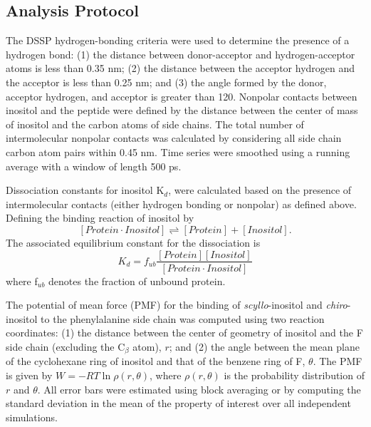 \subsection{Analysis Protocol} %
\label{sub:analysis}

	The DSSP hydrogen-bonding criteria were used to determine the presence of a hydrogen bond: (1) the distance between donor-acceptor and hydrogen-acceptor atoms is less than 0.35 nm; (2) the distance between the acceptor hydrogen and the acceptor is less than 0.25 nm; and (3) the angle formed by the donor, acceptor hydrogen, and acceptor is greater than 120\mathdeg.\cite{Kabsch:1983p31} Nonpolar contacts between inositol and the peptide were defined by the distance between the center of mass of inositol and the carbon atoms of side chains. The total number of intermolecular nonpolar contacts was calculated by considering all side chain carbon atom pairs within 0.45 nm. Time series were smoothed using a running average with a window of length 500 ps.

	Dissociation constants for inositol K$_d$, were calculated based on the presence of intermolecular contacts (either hydrogen bonding or nonpolar) as defined above. Defining the binding reaction of inositol by
\[ \left[ Protein\cdot Inositol \right] \rightleftharpoons \left[ Protein \right] +\left[ Inositol \right]. \]
The associated equilibrium constant for the dissociation is
\[ K_{d} = f_{ub}\frac{\left[ Protein \right]\left[ Inositol \right]}{\left[Protein \cdot Inositol\right]} \]
where f$_{ub}$ denotes the fraction of unbound protein.	

The potential of mean force (PMF) for the binding of  \emph{scyllo}-inositol and  \emph{chiro}-inositol to the phenylalanine side chain was computed using two reaction coordinates: (1) the distance between the center of geometry of inositol and the F side chain (excluding the C$_{\beta}$ atom), $r$; and (2) the angle between the mean plane of the cyclohexane ring of inositol and that of the benzene ring of F, $\theta$. The PMF is given by $\mathit{W}=-RT\ln\rho\left(r,\theta\right)$, where $\rho\left(r,\theta\right)$ is the probability distribution of $r$ and $\theta$. All error bars were estimated using block averaging or by computing the standard deviation in the mean of the property of interest over all independent simulations.
  
